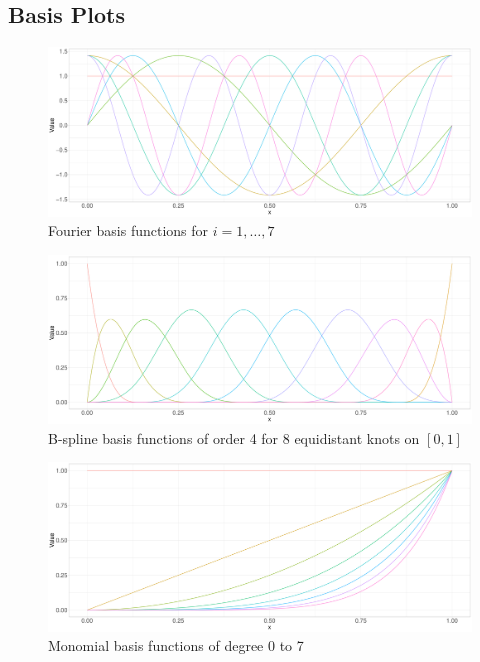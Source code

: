 \documentclass[11pt,twoside,a4paper]{article}
\begin{document}
	\newpage
	
	\subsection{Basis Plots}
	
	\begin{figure}[H]\label{Fourier_basis}
		\includegraphics[width = \textwidth]{../Graphics/Fourier_Basis.pdf}
		\caption{Fourier basis functions for $i = 1,\dots,7$}
	\end{figure}
	
	\begin{figure}[H]\label{B-spline_basis}
		\includegraphics[width = \textwidth]{../Graphics/Bspline_Basis.pdf}
		\caption{B-spline basis functions of order 4 for 8 equidistant knots on $[0,1]$}
	\end{figure}

	\begin{figure}[H]\label{monomial_basis}
		\includegraphics[width = \textwidth]{../Graphics/Monomial_Basis.pdf}
		\caption{Monomial basis functions of degree 0 to 7}
	\end{figure}
\end{document}
